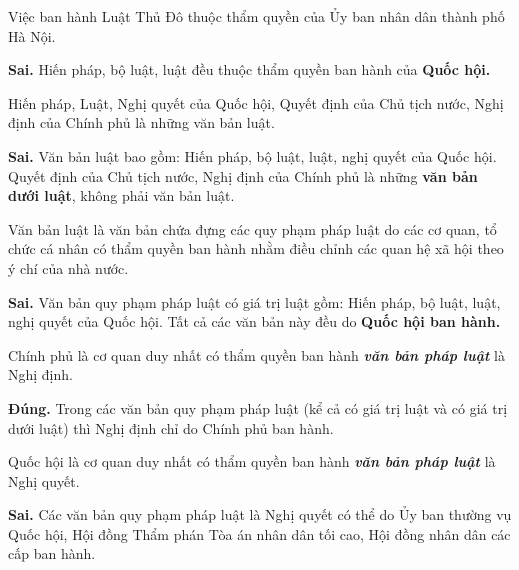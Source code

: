 \begin{ques}
Việc ban hành Luật Thủ Đô thuộc thẩm quyền của Ủy ban nhân dân thành phố Hà Nội.
\end{ques}
\begin{ans}
\textbf{Sai.} Hiến pháp, bộ luật, luật đều thuộc thẩm quyền ban hành của \textbf{Quốc hội.}
\end{ans}

\begin{ques}
Hiến pháp, Luật, Nghị quyết của Quốc hội, Quyết định của Chủ tịch nước, Nghị định của Chính phủ là những văn bản luật.
\end{ques}
\begin{ans}
\textbf{Sai.} Văn bản luật bao gồm: Hiến pháp, bộ luật, luật, nghị quyết của Quốc hội.\\
Quyết định của Chủ tịch nước, Nghị định của Chính phủ là những \textbf{văn bản dưới luật}, không phải văn bản luật.
\end{ans}

\begin{ques}
Văn bản luật là văn bản chứa đựng các quy phạm pháp luật do các cơ quan, tổ chức cá nhân có thẩm quyền ban hành nhằm điều chỉnh các quan hệ xã hội theo ý chí của nhà nước.
\end{ques}
\begin{ans}
\textbf{Sai.} Văn bản quy phạm pháp luật có giá trị luật gồm: Hiến pháp, bộ luật, luật, nghị quyết của Quốc hội. Tất cả các văn bản này đều do \textbf{Quốc hội ban hành.}
\end{ans}

\begin{ques}
Chính phủ là cơ quan duy nhất có thẩm quyền ban hành \textbf{\textit{văn bản pháp luật}} là Nghị định.
\end{ques}
\begin{ans}
\textbf{Đúng.} Trong các văn bản quy phạm pháp luật (kể cả có giá trị luật và có giá trị dưới luật) thì Nghị định chỉ do Chính phủ ban hành.
\end{ans}

\begin{ques}
Quốc hội là cơ quan duy nhất có thẩm quyền ban hành \textbf{\textit{văn bản pháp luật}} là Nghị quyết.
\end{ques}
\begin{ans}
\textbf{Sai.} Các văn bản quy phạm pháp luật là Nghị quyết có thể do Ủy ban thường vụ Quốc hội, Hội đồng Thẩm phán Tòa án nhân dân tối cao, Hội đồng nhân dân các cấp ban hành.
\end{ans}

